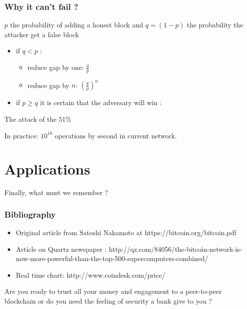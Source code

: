 \documentclass[12pt]{beamer}
\begin{document}
\begin{frame}
\frametitle{Why it can't fail ?}
$p$ the probability of adding a honest block and $q = (1-p)$ the probability the attacker get a false block
\begin{itemize}
\item if $q < p$ :
\begin{itemize}
\item reduce gap by one: $\frac{q}{p}$
\item reduce gap by $n$: $\left (\frac{q}{p}\right )^n$
\end{itemize}
\item if $p \ge q$ it is certain that the adversary will win : 
\end{itemize}
\begin{center}
\color{red!50!black} \large The attack of the $51\%$
\end{center}

In practice: $10^{18}$ operations by second in current network.

\end{frame}

\section{Applications}

\begin{frame}
Finally, what must we remember ? %
\end{frame}

\begin{frame}
\frametitle{Bibliography}
\begin{itemize}
\item Original article from Satoshi Nakamoto at https://bitcoin.org/bitcoin.pdf
\item Article on Quartz newspaper : http://qz.com/84056/the-bitcoin-network-is-now-more-powerful-than-the-top-500-supercomputers-combined/
\item Real time chart: http://www.coindesk.com/price/
\end{itemize}

\end{frame}

\begin{frame}

Are you ready to trust all your money and engagement to a peer-to-peer blockchain or do you need the feeling of security a bank give to you ?


\end{frame}
\end{document}
